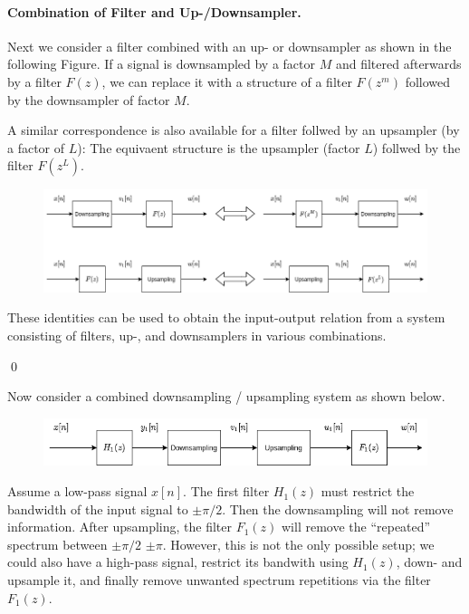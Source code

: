 \paragraph{Combination of Filter and Up-/Downsampler.} Next we consider a filter combined with an up- or downsampler as shown in the following Figure. If a signal is downsampled by a factor $M$ and filtered afterwards by a filter $F(z)$, we can replace it with a structure of a filter $F(z^m)$ followed by the downsampler of factor $M$.

A similar correspondence is also available for a filter follwed by an upsampler (by a factor of $L$): The equivaent structure is the upsampler (factor $L$) follwed by the filter $F(z^L)$. 


\begin{figure}[H]
    \centering
    \includegraphics[scale=0.45]{images/2021-11-09-subband_06a.png}
\end{figure}

These identities can be used to obtain the input-output relation from a system consisting of filters, up-, and downsamplers in various combinations.

\qed


Now consider a combined downsampling / upsampling system as shown below.


\begin{figure}[H]
    \centering
    \includegraphics[scale=0.5]{images/2021-11-09-subband_07.png}
\end{figure}


Assume a low-pass signal $x[n]$. The first filter $H_1(z)$ must restrict the bandwidth of the input signal to $\pm \pi/2$. Then the downsampling will not remove information. After upsampling, the filter $F_1(z)$ will remove the ``repeated'' spectrum between $\pm \pi/2$ $\pm \pi$. However, this is not the only possible setup; we could also have a high-pass signal, restrict its bandwith using $H_1(z)$, down- and upsample it, and finally remove unwanted spectrum repetitions via the filter $F_1(z)$.

